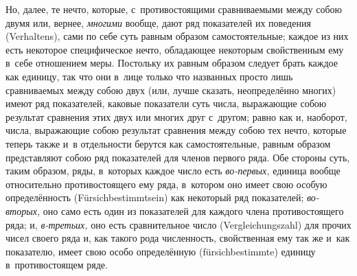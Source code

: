 Но, далее, те нечто, которые, с~противостоящими сравниваемыми между собою двумя
или, вернее, {\em многими} вообще, дают ряд показателей их поведения
(Ver\-hal\-tens), сами по себе суть равным образом самостоятельные; каждое из
них есть некоторое специфическое нечто, обладающее некоторым свойственным ему
в~себе отношением меры. Постольку их равным образом следует брать каждое как
единицу, так что они в~лице только что названных просто лишь сравниваемых между
собою двух (или, лучше сказать, неопределённо многих) имеют ряд показателей,
каковые показатели суть числа, выражающие собою результат сравнения этих двух
или многих друг с~другом; равно как и, наоборот, числа, выражающие собою
результат сравнения между собою тех нечто, которые теперь также и~в отдельности
берутся как самостоятельные, равным образом представляют собою ряд показателей
для членов первого ряда. Обе стороны суть, таким образом, ряды, в~которых
каждое число есть {\em во-первых,} единица вообще относительно противостоящего
ему ряда, в~котором оно имеет свою особую определённость
(Für\-sich\-bes\-timmt\-sein) как некоторый ряд показателей; {\em во-вторых,}
оно само есть один из показателей для каждого члена противостоящего ряда; и,
{\em в-третьих,} оно есть сравнительное число (Ver\-gleich\-ungs\-zahl) для
прочих чисел своего ряда и, как такого рода численность, свойственная ему так
же и~как показателю, имеет свою особо определённую (für\-sich\-bes\-timmte)
единицу в~противостоящем ряде.

